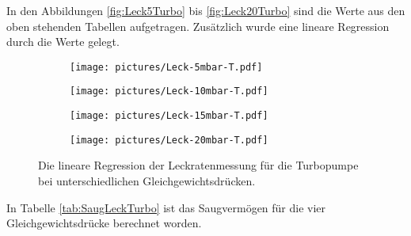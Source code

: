 In den Abbildungen \eqref{fig:Leck5Turbo} bis \eqref{fig:Leck20Turbo} sind die Werte aus den oben stehenden Tabellen aufgetragen. Zusätzlich wurde eine lineare Regression durch die Werte gelegt.

\begin{figure}
  \begin{subfigure}[c]{0.49\textwidth}
    \texttt{[image: pictures/Leck-5mbar-T.pdf]}
    \label{fig:Leck5Turbo}
  \end{subfigure}\hfill
  \begin{subfigure}[c]{0.49\textwidth}
    \texttt{[image: pictures/Leck-10mbar-T.pdf]}
    \label{fig:Leck10Turbo}
  \end{subfigure}

  \begin{subfigure}[c]{0.49\textwidth}
    \texttt{[image: pictures/Leck-15mbar-T.pdf]}
    \label{fig:Leck15Turbo}
  \end{subfigure}\hfill
  \begin{subfigure}[c]{0.49\textwidth}
    \texttt{[image: pictures/Leck-20mbar-T.pdf]}
    \label{fig:Leck20Turbo}
  \end{subfigure}

  \caption{Die lineare Regression der Leckratenmessung für die Turbopumpe bei unterschiedlichen Gleichgewichtsdrücken.}
\end{figure}

In Tabelle \eqref{tab:SaugLeckTurbo} ist das Saugvermögen für die vier Gleichgewichtsdrücke berechnet worden.

